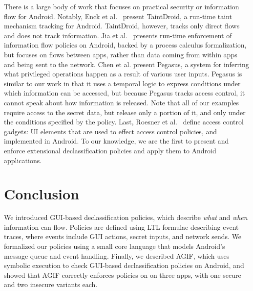 \documentclass[10pt,conference,compsocconf]{IEEEtran}
\newcommand{\toolname}{AGIF\xspace}
\begin{document}
There is a large body of work that focuses on practical security or
information flow for Android.  Notably, Enck et al.~\cite{Enck:10}
present TaintDroid, a run-time taint mechanism tracking for Android.
TaintDroid, however, tracks only direct flows and does not track
information.
Jia et al.~\cite{Jia:13} presents run-time enforcement of
information flow policies on Android, backed by a process calculus
formalization, but focuses on flows between apps, rather than data
coming from within apps and being sent to the network.
Chen et al. \cite{Chen:13} present Pegasus, a system for inferring
what privileged operations happen as a result of various user inputs.
Pegasus is similar to our work in that it uses a temporal logic to
express conditions under which information can be accessed, but
because Pegasus tracks access control, it cannot speak about how
information is released.  Note that all of our examples require access
to the secret data, but release only a portion of it, and only under
the conditions specified by the policy.  Last, Roesner et
al.~\cite{Roesner:12} define access control gadgets: UI elements that
are used to effect access control policies, and implemented in Android.
 To our knowledge, we are the
first to present and enforce extensional declassification policies and
apply them to Android applications.

\section{Conclusion}
\label{sec:conclusion}

We introduced GUI-based declassification policies, which describe
\emph{what} and \emph{when} information can flow. Policies are defined
using LTL formulae describing event traces, where events include GUI
actions, secret inputs, and network sends. We formalized our policies
using a small core language that models Android's message queue and
event handling. Finally, we described \toolname{}, which uses symbolic
execution to check GUI-based declassification policies on Android, and
showed that \toolname{} correctly enforces policies on on three apps,
with one secure and two insecure variants each.



\end{document}
